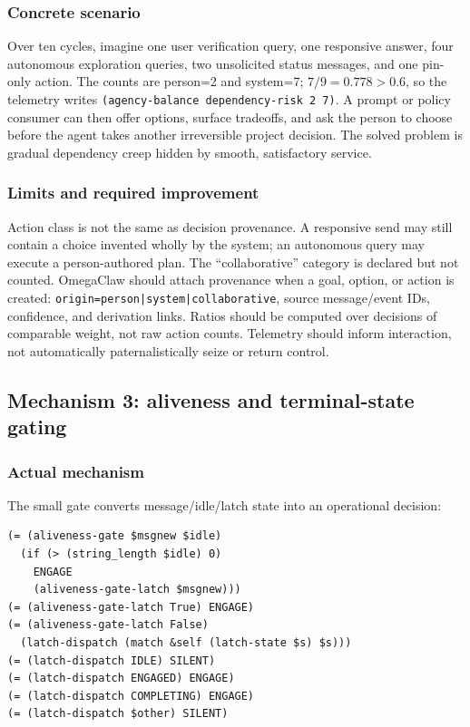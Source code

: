\documentclass[11pt]{article}
\begin{document}
\subsubsection{Concrete scenario}

Over ten cycles, imagine one user verification query, one responsive answer, four
autonomous exploration queries, two unsolicited status messages, and one pin-only
action.  The counts are person=2 and system=7; \(7/9=0.778>0.6\), so the telemetry
writes \texttt{(agency-balance dependency-risk 2 7)}.  A prompt or policy consumer
can then offer options, surface tradeoffs, and ask the person to choose before the
agent takes another irreversible project decision.  The solved problem is gradual
dependency creep hidden by smooth, satisfactory service.

\subsubsection{Limits and required improvement}

Action class is not the same as decision provenance.  A responsive send may still
contain a choice invented wholly by the system; an autonomous query may execute a
person-authored plan.  The ``collaborative'' category is declared but not counted.
OmegaClaw should attach provenance when a goal, option, or action is created:
\texttt{origin=person|system|collaborative}, source message/event IDs, confidence,
and derivation links.  Ratios should be computed over decisions of comparable
weight, not raw action counts.  Telemetry should inform interaction, not
automatically paternalistically seize or return control.

\subsection{Mechanism 3: aliveness and terminal-state gating}

\subsubsection{Actual mechanism}

The small gate converts message/idle/latch state into an operational decision:

\begin{lstlisting}
(= (aliveness-gate $msgnew $idle)
  (if (> (string_length $idle) 0)
    ENGAGE
    (aliveness-gate-latch $msgnew)))
(= (aliveness-gate-latch True) ENGAGE)
(= (aliveness-gate-latch False)
  (latch-dispatch (match &self (latch-state $s) $s)))
(= (latch-dispatch IDLE) SILENT)
(= (latch-dispatch ENGAGED) ENGAGE)
(= (latch-dispatch COMPLETING) ENGAGE)
(= (latch-dispatch $other) SILENT)
\end{lstlisting}
\end{document}
